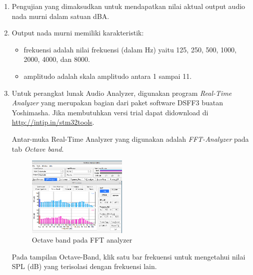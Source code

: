 \documentclass{article}
\begin{document}
	\begin{enumerate}
		\item Pengujian yang dimaksudkan untuk mendapatkan nilai aktual output audio nada murni dalam satuan dBA.

		\item Output nada murni memiliki karakteristik:
		\begin{itemize}
			\item frekuensi adalah nilai frekuensi (dalam Hz) yaitu 125, 250, 500, 1000, 2000, 4000, dan 8000.
			\item amplitudo adalah skala amplitudo antara 1 sampai 11.
		\end{itemize}

		\item Untuk perangkat lunak Audio Analyzer, digunakan program \textit{Real-Time Analyzer}
		yang merupakan bagian dari paket software DSFF3 buatan Yoshimasha.
		Jika membutuhkan versi trial dapat didownload di \url{http://intip.in/stm32tools}.

		Antar-muka Real-Time Analyzer yang digunakan adalah \textit{FFT-Analyzer} pada tab \textit{Octave band}.

		\begin{figure}[!ht]
			\centering
			\includegraphics[width=0.45\textwidth]{images/rta_fft}
			\caption{Octave band pada FFT analyzer}
		\end{figure}

		Pada tampilan Octave-Band, klik satu bar frekuensi untuk mengetahui nilai SPL (dB)
		yang terisolasi dengan frekuensi lain.



\end{enumerate}
\end{document}
